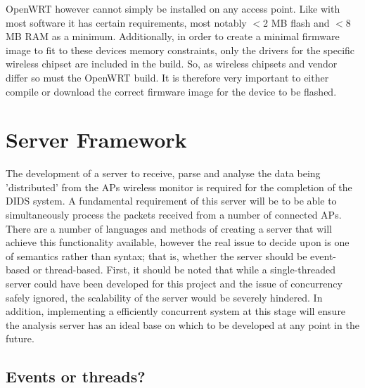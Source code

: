     OpenWRT however cannot simply be installed on any access point. Like with most software it has certain requirements, most notably $<$2 MB flash and $<$8 MB RAM as a minimum. Additionally, in order to create a minimal firmware image to fit to these devices memory constraints, only the drivers for the specific wireless chipset are included in the build. So, as wireless chipsets and vendor differ so must the OpenWRT build. It is therefore very important to either compile or download the correct firmware image for the device to be flashed.

  \section{Server Framework}

    The development of a server to receive, parse and analyse the data being 'distributed' from the APs wireless monitor is required for the completion of the DIDS system. A fundamental requirement of this server will be to be able to simultaneously process the packets received from a number of connected APs. There are a number of languages and methods of creating a server that will achieve this functionality available, however the real issue to decide upon is one of semantics rather than syntax; that is, whether the server should be event-based or thread-based. First, it should be noted that while a single-threaded server could have been developed for this project and the issue of concurrency safely ignored, the scalability of the server would be severely hindered. In addition, implementing a efficiently concurrent system at this stage will ensure the analysis server has an ideal base on which to be developed at any point in the future.

  \subsection{Events or threads?}

